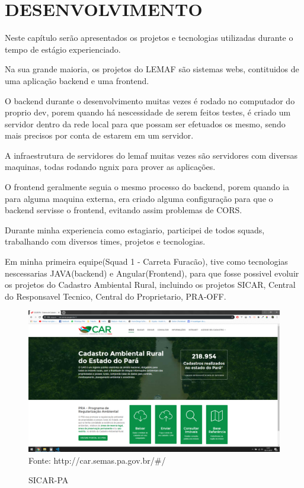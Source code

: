 \usepackage{float}
\chapter{DESENVOLVIMENTO}
\label{cap:desenvolvimento}

Neste capítulo serão apresentados os projetos e tecnologias utilizadas durante o tempo de estágio experienciado.

Na sua grande maioria, os projetos do LEMAF são sistemas webs, contituidos de uma aplicação backend e uma frontend.

O backend durante o desenvolvimento muitas vezes é rodado no computador do proprio dev, porem quando há nescessidade de serem feitos testes, é criado um servidor dentro da rede local para que possam ser efetuados os mesmo, sendo mais precisos por conta de estarem em um servidor.

A infraestrutura de servidores do lemaf muitas vezes são servidores com diversas maquinas, todas rodando ngnix para prover as aplicações.

O frontend geralmente seguia o mesmo processo do backend, porem quando ia para alguma maquina externa, era criado alguma configuração para que o backend servisse o frontend, evitando assim problemas de CORS.

Durante minha experiencia como estagiario, participei de todos squads, trabalhando com diversos times, projetos e tecnologias.

Em minha primeira equipe(Squad 1 - Carreta Furacão), tive como tecnologias nescessarias JAVA(backend) e Angular(Frontend), para que fosse possivel evoluir os projetos do Cadastro Ambiental Rural, incluindo os projetos SICAR, Central do Responsavel Tecnico, Central do Proprietario, PRA-OFF.
\begin{figure}[H]
\centering
\caption{SICAR-PA} %
\includegraphics[scale=0.3]{SICAR}\\  %
{\small Fonte: http://car.semas.pa.gov.br/#/} %
\label{fig:exemplo} %
\end{figure}

